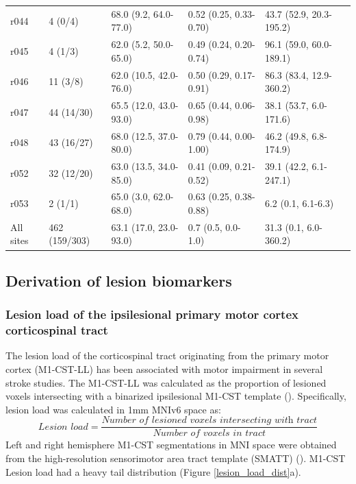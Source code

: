 \documentclass[10pt]{article}
\begin{document}
\begin{table}[h]
\begin{tabular}{llllll}
r044 & 4 (0/4) & 68.0 (9.2, 64.0-77.0) & 0.52 (0.25, 0.33-0.70) & 43.7 (52.9, 20.3-195.2) \\
r045 & 4 (1/3) & 62.0 (5.2, 50.0-65.0) & 0.49 (0.24, 0.20-0.74) & 96.1 (59.0, 60.0-189.1) \\
r046 & 11 (3/8) & 62.0 (10.5, 42.0-76.0) & 0.50 (0.29, 0.17-0.91) & 86.3 (83.4, 12.9-360.2) \\
r047 & 44 (14/30) & 65.5 (12.0, 43.0-93.0) & 0.65 (0.44, 0.06-0.98) & 38.1 (53.7, 6.0-171.6) \\
r048 & 43 (16/27) & 68.0 (12.5, 37.0-80.0) & 0.79 (0.44, 0.00-1.00) & 46.2 (49.8, 6.8-174.9) \\
r052 & 32 (12/20) & 63.0 (13.5, 34.0-85.0) & 0.41 (0.09, 0.21-0.52) & 39.1 (42.2, 6.1-247.1) \\
r053 & 2 (1/1) & 65.0 (3.0, 62.0-68.0) & 0.63 (0.25, 0.38-0.88) & 6.2 (0.1, 6.1-6.3) \\
 \arrayrulecolor{black!30}\midrule
All sites & 462 (159/303) & 63.1 (17.0, 23.0-93.0) & 0.7 (0.5, 0.0-1.0) & 31.3 (0.1, 6.0-360.2)  \\
\bottomrule
\end{tabular}
\end{table}




\subsection{Derivation of lesion biomarkers}
\subsubsection*{Lesion load of the ipsilesional primary motor cortex corticospinal tract}
The lesion load of the corticospinal tract originating from the primary motor cortex (M1-CST-LL) has been associated with motor impairment in several stroke studies. The M1-CST-LL was calculated as the proportion of lesioned voxels intersecting with a binarized ipsilesional M1-CST template (\cite{Zhu2010-qh}). Specifically, lesion load was calculated in 1mm MNIv6 space as:
\begin{equation}
    \textit{Lesion load} = \frac{\textit{Number of lesioned voxels intersecting with  tract}}{\textit{Number of voxels in tract}}
\end{equation}
Left and right hemisphere M1-CST segmentations in MNI space were obtained from the high-resolution sensorimotor area tract template (SMATT) (\cite{Archer2018-ti}). M1-CST Lesion load had a heavy tail distribution (Figure \ref{lesion_load_dist}a).
 
\end{document}
